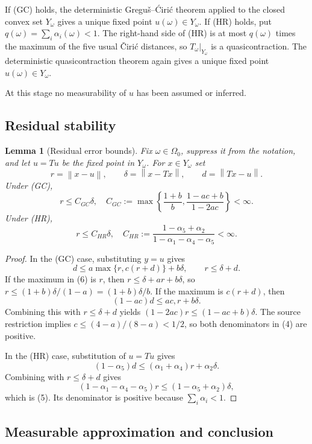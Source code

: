 \documentclass[11pt]{article}
\newtheorem{lemma}[theorem]{Lemma}
\newcommand{\norm}[1]{\left\lVert #1\right\rVert}
\begin{document}
If (GC) holds, the deterministic Gregu\v{s}--\'{C}iri\'{c} theorem
\cite{ciric2000} applied to the closed convex set $Y_\omega$ gives a unique
fixed point $u(\omega)\in Y_\omega$.  If (HR) holds, put
$q(\omega)=\sum_i\alpha_i(\omega)<1$.  The right-hand side of (HR) is at most
$q(\omega)$ times the maximum of the five usual \v{C}iri\'{c} distances, so
$T_\omega|_{Y_\omega}$ is a quasicontraction.  The deterministic
quasicontraction theorem \cite{ciric1974} again gives a unique fixed point
$u(\omega)\in Y_\omega$.

At this stage no measurability of $u$ has been assumed or inferred.

\subsection{Residual stability}

\begin{lemma}[Residual error bounds]\label{lem:residual}
Fix $\omega\in\Omega_0$, suppress it from the notation, and let $u=Tu$ be
the fixed point in $Y_\omega$.  For $x\in Y_\omega$ set
\[
 r=\norm{x-u},\qquad \delta=\norm{x-Tx},\qquad d=\norm{Tx-u}.
\]
Under (GC),
\[
 r\le C_{GC}\delta,
 \quad
 C_{GC}:=\max\left\{\frac{1+b}{b},
 \frac{1-ac+b}{1-2ac}\right\}<\infty.
 \tag{4}
\]
Under (HR),
\[
 r\le C_{HR}\delta,
 \quad
 C_{HR}:=\frac{1-\alpha_5+\alpha_2}
 {1-\alpha_1-\alpha_4-\alpha_5}<\infty.
 \tag{5}
\]
\end{lemma}

\begin{proof}
In the (GC) case, substituting $y=u$ gives
\[
 d\le a\max\{r,c(r+d)\}+b\delta,
 \qquad r\le\delta+d.
 \tag{6}
\]
If the maximum in (6) is $r$, then
$r\le\delta+ar+b\delta$, so
$r\le(1+b)\delta/(1-a)=(1+b)\delta/b$.
If the maximum is $c(r+d)$, then
\[
 (1-ac)d\le ac,r+b\delta.
\]
Combining this with $r\le\delta+d$ yields
$(1-2ac)r\le(1-ac+b)\delta$.  The source restriction implies
$c\le(4-a)/(8-a)<1/2$, so both denominators in (4) are positive.

In the (HR) case, substitution of $u=Tu$ gives
\[
 (1-\alpha_5)d
 \le(\alpha_1+\alpha_4)r+\alpha_2\delta.
\]
Combining with $r\le\delta+d$ gives
\[
 (1-\alpha_1-\alpha_4-\alpha_5)r
 \le(1-\alpha_5+\alpha_2)\delta,
\]
which is (5).  Its denominator is positive because
$\sum_i\alpha_i<1$.
\end{proof}

\subsection{Measurable approximation and conclusion}
\end{document}
